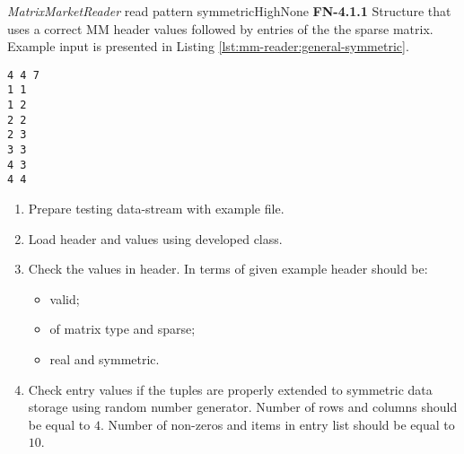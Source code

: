 	\begin{testcase}{\emph{MatrixMarketReader} read pattern symmetric}{High}{None}
		{
			\textbf{FN-4.1.1}
		}
		{
			Structure that uses a correct \gls{MM} header values followed by entries of the the sparse matrix. Example input is presented in Listing \ref{lst:mm-reader:general-symmetric}. 	
		}
		\begin{lstlisting}[label={lst:mm-reader:general-symmetric},
		basicstyle=\small,caption={\gls{MM} format data example}, frame=single]
%%MatrixMarket matrix coordinate pattern symmetric
4 4 7
1 1 
1 2 
2 2
2 3
3 3
4 3
4 4
		\end{lstlisting}
		{
			\begin{enumerate}
				\item Prepare testing data-stream with example file.
				\item Load header and values using developed class.
				\item
				{
					Check the values in header. In terms of given example header should be:
					\begin{itemize}
						\item valid;
						\item of matrix type and sparse;
						\item real and symmetric.
					\end{itemize}
				}
				\item
				{
					Check entry values if the tuples are properly extended to symmetric data storage using random number generator.
					Number of rows and columns should be equal to $4$. Number of non-zeros and items in entry list should be equal to $10$.
				}
			\end{enumerate}
		}
	\end{testcase}
